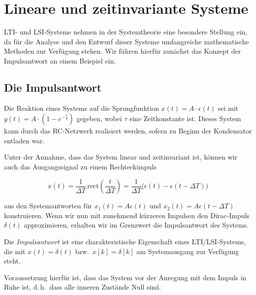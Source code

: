 \section{Lineare und zeitinvariante Systeme}
\label{sec:lti-systeme}

LTI- und LSI-Systeme nehmen in der Systemtheorie eine besondere Stellung ein, da für die Analyse und den Entwurf dieser Systeme umfangreiche mathematische Methoden zur Verfügung stehen. Wir führen hierfür zunächst das Konzept der Impulsantwort an einem Beispiel ein.

\subsection{Die Impulsantwort}
\label{sec:impulsantwort}

Die Reaktion eines Systems auf die Sprungfunktion $x(t) = A \cdot \epsilon(t)$ sei mit $y(t) = A \cdot (1 - e^{-\frac{t}{\tau}})$ gegeben, wobei $\tau$ eine Zeitkonstante ist. Dieses System kann durch das RC-Netzwerk realisiert werden, sofern zu Beginn der Kondensator entladen war.

Unter der Annahme, dass das System linear und zeitinvariant ist, können wir auch das Ausgangssignal zu einem Rechteckimpuls

$$
x(t) = \frac{1}{\Delta T}\,\mathrm{rect}\!\left(\frac{t}{\Delta T}\right) = \frac{1}{\Delta T}\bigl(\epsilon(t) - \epsilon(t - \Delta T)\bigr)
$$

aus den Systemantworten für $x_1(t) = A\epsilon(t)$ und $x_2(t) = A\epsilon(t - \Delta T)$ konstruieren. Wenn wir nun mit zunehmend kürzeren Impulsen den Dirac-Impuls $\delta(t)$ approximieren, erhalten wir im Grenzwert die Impulsantwort des Systems.


\begin{definition}[Impulsantwort]
Die \textit{Impulsantwort} ist eine charakteristische Eigenschaft eines LTI/LSI-Systems, die mit $x(t) = \delta(t)$ bzw.\ $x[k] = \delta[k]$ am Systemausgang zur Verfügung steht.

\begin{center}
\end{center}

Voraussetzung hierfür ist, dass das System vor der Anregung mit dem Impuls in Ruhe ist, d.\,h.\ dass alle inneren Zustände Null sind.
\end{definition}

